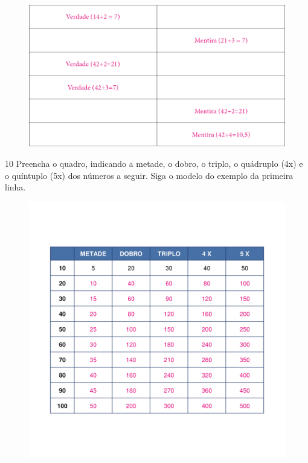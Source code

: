 \begin{figure}[htpb!]
\includegraphics[width=\textwidth]{./media/image110.png}
\end{figure}

\pagebreak
\num{10} Preencha o quadro, indicando a metade, o dobro, o triplo, o quádruplo
(4x) e o quíntuplo (5x) dos números a seguir. Siga o modelo do exemplo da
primeira linha.

\begin{figure}[htpb!]
\includegraphics[width=\textwidth]{./media/image111_prof.png}
\end{figure}


